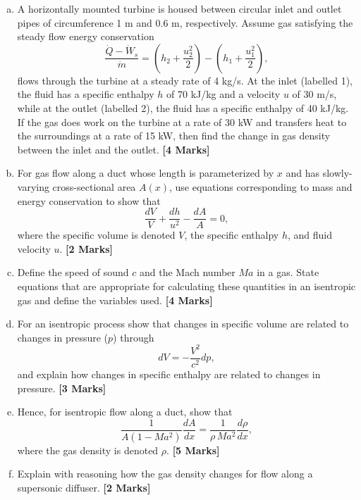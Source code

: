 \documentclass[calculator,steamtables,refrigeranttables,psychrometricchart,datasheet,sample]{exam}
\newcommand{\frc}{\displaystyle\frac}
\begin{document}
\begin{question}\vspace{-2\baselineskip}

\begin{enumerate}[(a)]
%
\item A horizontally mounted turbine is housed between circular inlet and outlet pipes of circumference 1 m and 0.6 m, respectively. Assume gas satisfying the steady flow energy conservation
\begin{displaymath}
\frc{ \dot{Q} -\dot{W}_{s}}{\dot{m}} = \left( h_{2}+ \frc{u_{2}^{2}}{2}\right) - \left(h_{1} + \frc{u_{1}^{2}}{2}\right),
\end{displaymath}
flows through the turbine at a steady rate of 4 kg/s. At the inlet (labelled 1), the fluid has a specific enthalpy $h$ of 70 kJ/kg and a velocity $u$ of 30 m/s, while at the outlet (labelled 2), the fluid has a specific enthalpy of 40 kJ/kg. If the gas does work on the turbine at a rate of 30 kW and transfers heat to the surroundings at a rate of 15 kW, then find the change in gas density between the inlet and the outlet. {\bf [4 Marks]}

%
\item For gas flow along a duct whose length is parameterized by $x$ and has slowly-varying cross-sectional area  $A(x)$, use equations corresponding to mass and energy conservation to show that
\begin{displaymath}
\frc{dV}{V} + \frc{d h}{u^{2}} - \frc{dA}{A}=0,
\end{displaymath}
where the specific volume is denoted $V$, the specific enthalpy $h$, and fluid velocity $u$. {\bf [2 Marks]}
\medskip

\item Define the speed of sound $c$ and the Mach number $M\! a$ in a gas. State equations that are appropriate for calculating these quantities in an isentropic gas and define the variables used. {\bf [4 Marks]}
\medskip

\item For an isentropic process show that changes in specific volume are related to changes in pressure ($p$) through
\begin{displaymath}
dV=-\frc{V^{2}}{c^{2}}dp,
\end{displaymath}
and explain how changes in specific enthalpy are related to changes in pressure. {\bf [3 Marks]}
\medskip

\item Hence, for isentropic flow along a duct, show that
\begin{displaymath}
\frc{1}{A\left(1- M\! a^{2}\right)}\frc{dA}{dx} = \frc{1}{\rho \, M\! a^{2}}\frc{d\rho}{dx},
\end{displaymath}
where the gas density is denoted $\rho$. {\bf [5 Marks]}
\medskip

\item Explain with reasoning how the gas density changes for flow along a supersonic diffuser. {\bf [2 Marks]}
%
\end{enumerate}

\end{question}
\end{document}
